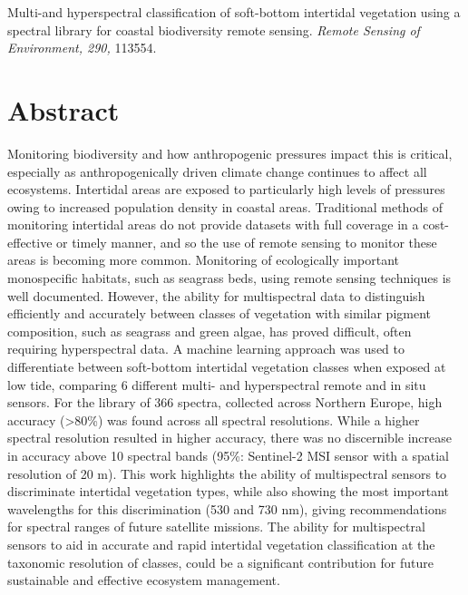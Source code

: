 \documentclass[
  letterpaper,
  11pt,
  english,
  singlespacing,
  headsepline]{MastersDoctoralThesis}
\begin{document}
\noindent
{}
\hspace*{2em}\begin{minipage}{0.9\textwidth}
Multi-and hyperspectral classification of soft-bottom intertidal vegetation using a spectral library for coastal biodiversity remote sensing. \textit{Remote Sensing of Environment, 290,} 113554.
\end{minipage}

\section*{Abstract}\label{abstract}


Monitoring biodiversity and how anthropogenic pressures impact this is
critical, especially as anthropogenically driven climate change
continues to affect all ecosystems. Intertidal areas are exposed to
particularly high levels of pressures owing to increased population
density in coastal areas. Traditional methods of monitoring intertidal
areas do not provide datasets with full coverage in a cost-effective or
timely manner, and so the use of remote sensing to monitor these areas
is becoming more common. Monitoring of ecologically important
monospecific habitats, such as seagrass beds, using remote sensing
techniques is well documented. However, the ability for multispectral
data to distinguish efficiently and accurately between classes of
vegetation with similar pigment composition, such as seagrass and green
algae, has proved difficult, often requiring hyperspectral data. A
machine learning approach was used to differentiate between soft-bottom
intertidal vegetation classes when exposed at low tide, comparing 6
different multi- and hyperspectral remote and in situ sensors. For the
library of 366 spectra, collected across Northern Europe, high accuracy
(\textgreater80\%) was found across all spectral resolutions. While a
higher spectral resolution resulted in higher accuracy, there was no
discernible increase in accuracy above 10 spectral bands (95\%:
Sentinel-2 MSI sensor with a spatial resolution of 20 m). This work
highlights the ability of multispectral sensors to discriminate
intertidal vegetation types, while also showing the most important
wavelengths for this discrimination (530 and 730 nm), giving
recommendations for spectral ranges of future satellite missions. The
ability for multispectral sensors to aid in accurate and rapid
intertidal vegetation classification at the taxonomic resolution of
classes, could be a significant contribution for future sustainable and
effective ecosystem management.
\end{document}
